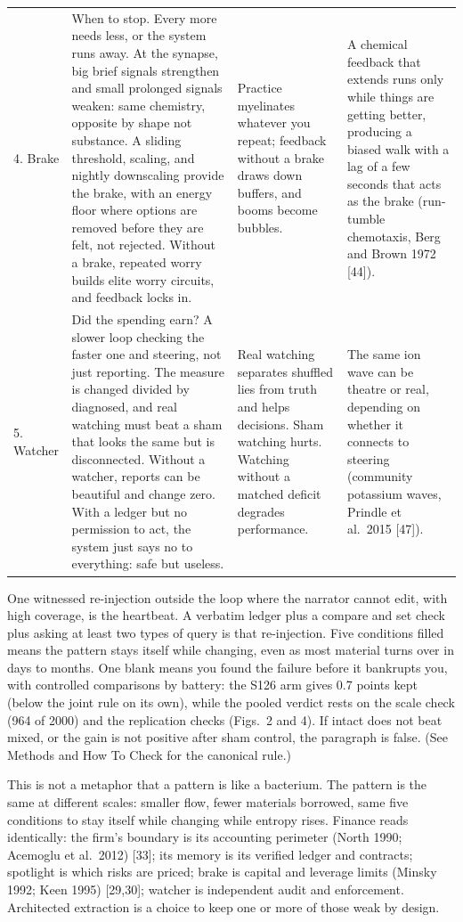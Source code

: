 \documentclass[11pt,a4paper]{article}
\begin{document}
\begin{table}[h]
\begin{tabular}{p{1.4cm}p{3.5cm}p{3.5cm}p{3.5cm}}
4. Brake & When to stop. Every more needs less, or the system runs away. At the synapse, big brief signals strengthen and small prolonged signals weaken: same chemistry, opposite by shape not substance. A sliding threshold, scaling, and nightly downscaling provide the brake, with an energy floor where options are removed before they are felt, not rejected. Without a brake, repeated worry builds elite worry circuits, and feedback locks in. & Practice myelinates whatever you repeat; feedback without a brake draws down buffers, and booms become bubbles. & A chemical feedback that extends runs only while things are getting better, producing a biased walk with a lag of a few seconds that acts as the brake (run-tumble chemotaxis, Berg and Brown 1972 [44]). \\
5. Watcher & Did the spending earn? A slower loop checking the faster one and steering, not just reporting. The measure is changed divided by diagnosed, and real watching must beat a sham that looks the same but is disconnected. Without a watcher, reports can be beautiful and change zero. With a ledger but no permission to act, the system just says no to everything: safe but useless. & Real watching separates shuffled lies from truth and helps decisions. Sham watching hurts. Watching without a matched deficit degrades performance. & The same ion wave can be theatre or real, depending on whether it connects to steering (community potassium waves, Prindle et al.\ 2015 [47]). \\
\bottomrule
\end{tabular}
\end{table}

One witnessed re-injection outside the loop where the narrator cannot edit, with high coverage, is the heartbeat. A verbatim ledger plus a compare and set check plus asking at least two types of query is that re-injection. Five conditions filled means the pattern stays itself while changing, even as most material turns over in days to months. One blank means you found the failure before it bankrupts you, with controlled comparisons by battery: the S126 arm gives 0.7 points kept (below the joint rule on its own), while the pooled verdict rests on the scale check (964 of 2000) and the replication checks (Figs.~2 and 4). If intact does not beat mixed, or the gain is not positive after sham control, the paragraph is false. (See Methods and How To Check for the canonical rule.)

This is not a metaphor that a pattern is like a bacterium. The pattern is the same at different scales: smaller flow, fewer materials borrowed, same five conditions to stay itself while changing while entropy rises. Finance reads identically: the firm's boundary is its accounting perimeter (North 1990; Acemoglu et al.\ 2012) [33]; its memory is its verified ledger and contracts; spotlight is which risks are priced; brake is capital and leverage limits (Minsky 1992; Keen 1995) [29,30]; watcher is independent audit and enforcement. Architected extraction is a choice to keep one or more of those weak by design.
\end{document}
